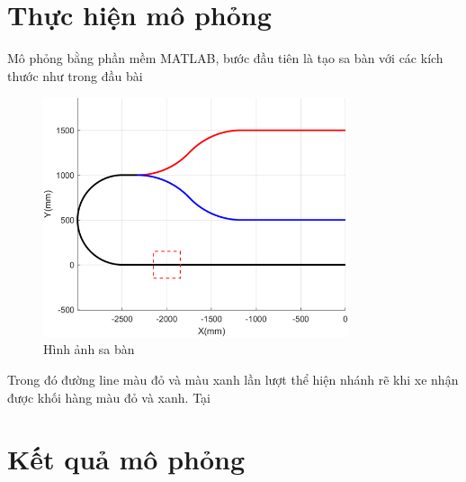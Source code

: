      \section{Thực hiện mô phỏng}
     \hspace*{0.6cm}Mô phỏng bằng phần mềm MATLAB, bước đầu tiên là tạo sa bàn với các kích thước như trong đầu bài
     \begin{figure}[H]
          \centering
          \includegraphics[width=0.8\textwidth]{pictures/chapter8/saban.png}
          \caption{Hình ảnh sa bàn}
          \label{saban}
     \end{figure}
     \hspace*{0.6cm}Trong đó đường line màu đỏ và màu xanh lần lượt thể hiện nhánh rẽ khi xe nhận được khối hàng màu đỏ và xanh. Tại 
     


     \section{Kết quả mô phỏng}
     \newpage
